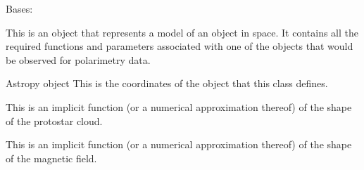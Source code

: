 \documentclass[letterpaper,10pt,english]{sphinxmanual}
\begin{document}
\begin{fulllineitems}
\label{\detokenize{model_observing:model_observing.ProtostarModel}}
Bases: 

This is an object that represents a model of an object in space. It
contains all the required functions and parameters associated with
one of the objects that would be observed for polarimetry data.

\begin{fulllineitems}
\label{\detokenize{model_observing:model_observing.ProtostarModel.self.coordinates}}
Astropy  object \textendash{} This is the coordinates of the object that this class defines.

\end{fulllineitems}


\begin{fulllineitems}
\label{\detokenize{model_observing:model_observing.ProtostarModel.self.cloud_model}}
 \textendash{} This is an implicit function (or a numerical approximation thereof) of
the shape of the protostar cloud.

\end{fulllineitems}


\begin{fulllineitems}
\label{\detokenize{model_observing:model_observing.ProtostarModel.self.magnetic_field}}
 \textendash{} This is an implicit function (or a numerical approximation thereof) of
the shape of the magnetic field.


\end{fulllineitems}
\end{fulllineitems}
\end{document}
